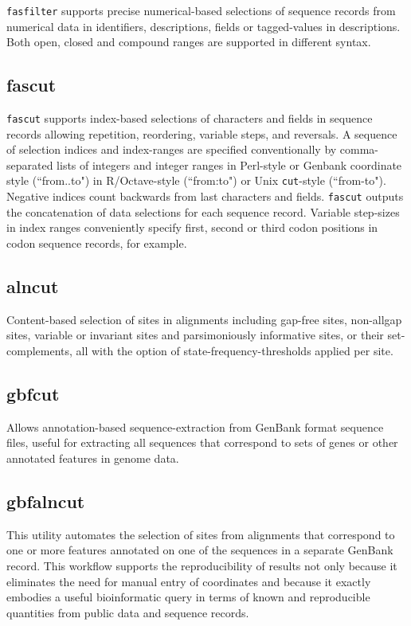 \documentclass{frontiersSCNS} %
\begin{document}
{\tt fasfilter} supports precise numerical-based selections of
sequence records from numerical data in identifiers, descriptions, fields
or tagged-values in descriptions. Both open, closed and compound
ranges are supported in different syntax.

\subsection{fascut}

{\tt fascut} supports index-based selections of characters and fields
in sequence records allowing repetition, reordering, variable steps,
and reversals.  A sequence of selection indices and index-ranges are
specified conventionally by comma-separated lists of integers and
integer ranges in Perl-style or Genbank coordinate style (``from..to")
in R/Octave-style (``from:to") or Unix {\tt cut}-style
(``from-to"). Negative indices count backwards from last characters and
fields. {\tt fascut} outputs the concatenation of data selections for
each sequence record.  Variable step-sizes in index ranges
conveniently specify first, second or third codon positions in codon
sequence records, for example.

\subsection{alncut}
Content-based selection of sites in alignments including gap-free
sites, non-allgap sites, variable or invariant sites and
parsimoniously informative sites, or their set-complements, all with
the option of state-frequency-thresholds applied per site.

\subsection{gbfcut} 

Allows annotation-based sequence-extraction from GenBank format
sequence files, useful for extracting all sequences that correspond to
sets of genes or other annotated features in genome data.

\subsection{gbfalncut} 
This utility automates the selection of sites from alignments that
correspond to one or more features annotated on one of the sequences
in a separate GenBank record. This workflow supports the
reproducibility of results not only because it eliminates the need for manual entry of
coordinates and because it exactly embodies a useful bioinformatic
query in terms of known and reproducible quantities from public data
and sequence records.
\end{document}
